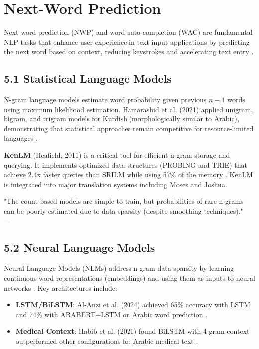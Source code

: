 \documentclass{article}
\begin{document}
\section{\textcolor{accentred}{Next-Word Prediction}}

Next-word prediction (NWP) and word auto-completion (WAC) are fundamental NLP tasks that enhance user experience in text input applications by predicting the next word based on context, reducing keystrokes and accelerating text entry \cite{alanzi2024revealing}.

\subsection*{5.1 Statistical Language Models}
N-gram language models estimate word probability given previous $n-1$ words using maximum likelihood estimation. Hamarashid et al. (2021) applied unigram, bigram, and trigram models for Kurdish (morphologically similar to Arabic), demonstrating that statistical approaches remain competitive for resource-limited languages \cite{hamarashid2021next}.

\textbf{KenLM} (Heafield, 2011) is a critical tool for efficient n-gram storage and querying. It implements optimized data structures (PROBING and TRIE) that achieve 2.4x faster queries than SRILM while using 57\% of the memory \cite{heafield2011kenlm}. KenLM is integrated into major translation systems including Moses and Joshua.

\begin{tcolorbox}[quotebox]
"The count-based models are simple to train, but probabilities of rare n-grams can be poorly estimated due to data sparsity (despite smoothing techniques)." \\
\raggedleft — \cite{kim2016character}
\end{tcolorbox}

\subsection*{5.2 Neural Language Models}
Neural Language Models (NLMs) address n-gram data sparsity by learning continuous word representations (embeddings) and using them as inputs to neural networks \cite{kim2016character}. Key architectures include:



\begin{itemize}
    \item \textbf{LSTM/BiLSTM}: Al-Anzi et al. (2024) achieved 65\% accuracy with LSTM and 74\% with ARABERT+LSTM on Arabic word prediction \cite{alanzi2024revealing}. 
    \item \textbf{Medical Context}: Habib et al. (2021) found BiLSTM with 4-gram context outperformed other configurations for Arabic medical text \cite{habib2021predictive}.
\end{itemize}
\end{document}
